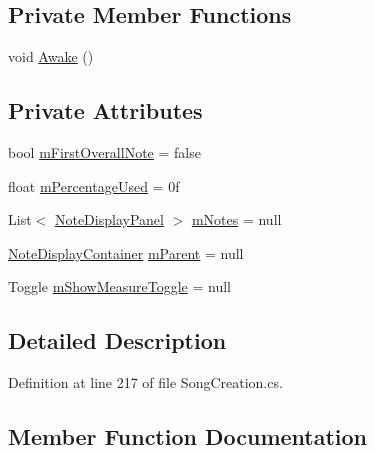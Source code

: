 \subsection*{Private Member Functions}
\begin{DoxyCompactItemize}
\item 
void \hyperlink{class_song_creation_1_1_measure_display_panel_ad38f91e55d3c37e520a35a2a0e620b42}{Awake} ()
\end{DoxyCompactItemize}
\subsection*{Private Attributes}
\begin{DoxyCompactItemize}
\item 
bool \hyperlink{class_song_creation_1_1_measure_display_panel_a3794bf2a605eaa0595e6c6e41f5b458c}{m\+First\+Overall\+Note} = false
\item 
float \hyperlink{class_song_creation_1_1_measure_display_panel_a87241a464e8e3ed8ad9011fcebaec50a}{m\+Percentage\+Used} = 0f
\item 
List$<$ \hyperlink{class_song_creation_1_1_note_display_panel}{Note\+Display\+Panel} $>$ \hyperlink{class_song_creation_1_1_measure_display_panel_a096dfc8481f3defcdcb57bfc140ac953}{m\+Notes} = null
\item 
\hyperlink{class_song_creation_1_1_note_display_container}{Note\+Display\+Container} \hyperlink{class_song_creation_1_1_measure_display_panel_a997c583ac0b9687ff9399c9ed27d0dcb}{m\+Parent} = null
\item 
Toggle \hyperlink{class_song_creation_1_1_measure_display_panel_abe01653518d60c345faa462ccf979a55}{m\+Show\+Measure\+Toggle} = null
\end{DoxyCompactItemize}


\subsection{Detailed Description}


Definition at line 217 of file Song\+Creation.\+cs.



\subsection{Member Function Documentation}
\mbox{\label{class_song_creation_1_1_measure_display_panel_a620c513de8f4e5e4dbf769d1ca7b711b}} 
